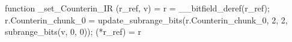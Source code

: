 function _set_Counterin_IR (r_ref, v) = {
    r = __bitfield_deref(r_ref);
    r.Counterin_chunk_0 = update_subrange_bits(r.Counterin_chunk_0, 2, 2, subrange_bits(v, 0, 0));
    (*r_ref) = r
}
